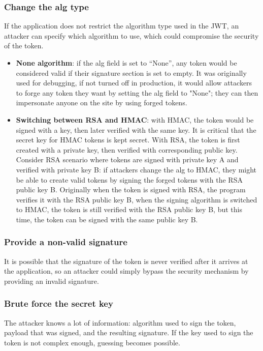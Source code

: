 \documentclass[a4paper, 10pt, titlepage]{article}
\begin{document}
\subsubsection*{Change the alg type}
If the application does not restrict the algorithm type used in the JWT, an attacker can specify which algorithm to use, which could compromise the security of the token.
\begin{itemize}
\item \textbf{None algorithm}: if the alg field is set to “None”, any token would be considered valid if their signature section is set to empty. It was originally used for debugging, if not turned off in production, it would allow attackers to forge any token they want by setting the alg field to "None"; they can then impersonate anyone on the site by using forged tokens.
\item \textbf{Switching between RSA and HMAC}: with HMAC, the token would be signed with a key, then later verified with the same key. It is critical that the secret key for HMAC tokens is kept secret. With RSA, the token is first created with a private key, then verified with corresponding public key. Consider RSA scenario where tokens are signed with private key A and verified with private key B: if attackers change the alg to HMAC, they might be able to create valid tokens by signing the forged tokens with the RSA public key B. Originally when the token is signed with RSA, the program verifies it with the RSA public key B, when the signing algorithm is switched to HMAC, the token is still verified with the RSA public key B, but this time, the token can be signed with the same public key B.
\end{itemize}

\subsubsection*{Provide a non-valid signature}
It is possible that the signature of the token is never verified after it arrives at the application, so an attacker could simply bypass the security mechanism by providing an invalid signature.

\subsubsection*{Brute force the secret key}
The attacker knows a lot of information: algorithm used to sign the token, payload that was signed, and the resulting signature. If the key used to sign the token is not complex enough, guessing becomes possible.
\end{document}
